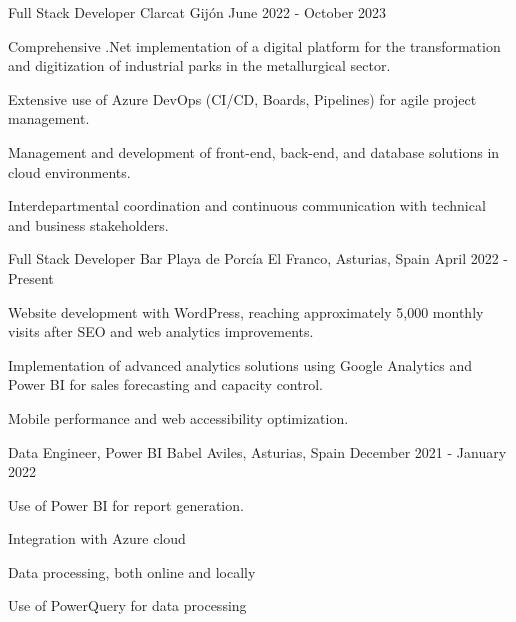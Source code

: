 \begin{cventries}
    \cventry
    {Full Stack Developer} %
    {Clarcat} %
    {Gijón} %
    {June 2022 - October 2023} %
    {
        \begin{cvitems}
            \item {Comprehensive .Net implementation of a digital platform for the transformation and digitization of industrial parks in the metallurgical sector.}
            \item {Extensive use of Azure DevOps (CI/CD, Boards, Pipelines) for agile project management.}
            \item {Management and development of front-end, back-end, and database solutions in cloud environments.}
            \item {Interdepartmental coordination and continuous communication with technical and business stakeholders.}
        \end{cvitems}
    }
    \cventry
    {Full Stack Developer} %
    {Bar Playa de Porcía} %
    {El Franco, Asturias, Spain} %
    {April 2022 - Present} %
    {
        \begin{cvitems}
            \item {Website development with WordPress, reaching approximately 5,000 monthly visits after SEO and web analytics improvements.}
            \item {Implementation of advanced analytics solutions using Google Analytics and Power BI for sales forecasting and capacity control.}
            \item {Mobile performance and web accessibility optimization.}
        \end{cvitems}
    }

\cventry
{Data Engineer, Power BI} %
{Babel} %
{Aviles, Asturias, Spain} %
{December 2021 - January 2022} %
{
    \begin{cvitems} %
        \item {Use of Power BI for report generation.}
        \item  {Integration with Azure cloud}
        \item {Data processing, both online and locally}
        \item {Use of PowerQuery for data processing}
    \end{cvitems}
}


\end{cventries}
